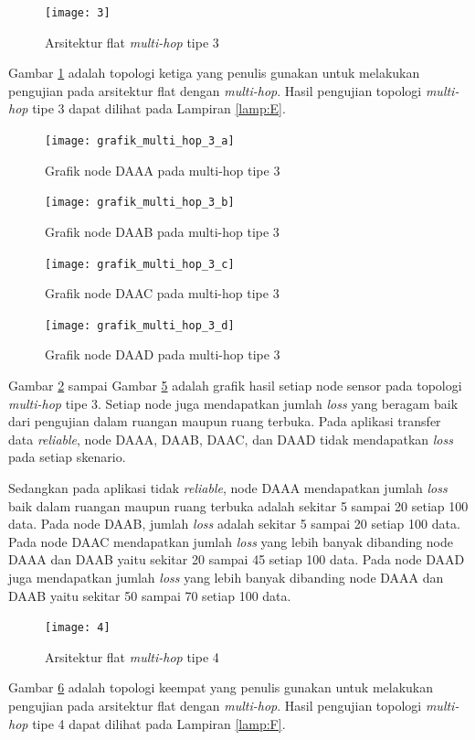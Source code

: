 \begin{figure}[H]
	\centering
	\texttt{[image: 3]}
	\caption{Arsitektur flat \textit{multi-hop} tipe 3}
	\label{fig:3}
\end{figure}
Gambar \ref{fig:3} adalah topologi ketiga yang penulis gunakan untuk melakukan pengujian pada arsitektur flat dengan \textit{multi-hop}. Hasil pengujian topologi \textit{multi-hop} tipe 3 dapat dilihat pada Lampiran \ref{lamp:E}. 

\begin{figure}[H]
	\centering
	\texttt{[image: grafik\_multi\_hop\_3\_a]}
	\caption{Grafik node DAAA pada multi-hop tipe 3}
	\label{fig:grafik_multi_hop_3_a}
\end{figure}
\begin{figure}[H]
	\centering
	\texttt{[image: grafik\_multi\_hop\_3\_b]}
	\caption{Grafik node DAAB pada multi-hop tipe 3}
	\label{fig:grafik_multi_hop_3_b}
\end{figure}
\begin{figure}[H]
	\centering
	\texttt{[image: grafik\_multi\_hop\_3\_c]}
	\caption{Grafik node DAAC pada multi-hop tipe 3}
	\label{fig:grafik_multi_hop_3_c}
\end{figure}
\begin{figure}[H]
	\centering
	\texttt{[image: grafik\_multi\_hop\_3\_d]}
	\caption{Grafik node DAAD pada multi-hop tipe 3}
	\label{fig:grafik_multi_hop_3_d}
\end{figure}
Gambar \ref{fig:grafik_multi_hop_3_a} sampai Gambar \ref{fig:grafik_multi_hop_3_d} adalah grafik hasil setiap node sensor pada topologi \textit{multi-hop} tipe 3. Setiap node juga mendapatkan jumlah \textit{loss} yang beragam baik dari pengujian dalam ruangan maupun ruang terbuka. Pada aplikasi transfer data \textit{reliable}, node DAAA, DAAB, DAAC, dan DAAD tidak mendapatkan \textit{loss} pada setiap skenario.

Sedangkan pada aplikasi tidak \textit{reliable}, node DAAA mendapatkan jumlah \textit{loss} baik dalam ruangan maupun ruang terbuka adalah sekitar  5 sampai 20 setiap 100 data. Pada node DAAB, jumlah \textit{loss} adalah sekitar 5 sampai 20 setiap 100 data. Pada node DAAC mendapatkan jumlah \textit{loss} yang lebih banyak dibanding node DAAA dan DAAB yaitu sekitar 20 sampai 45 setiap 100 data. Pada node DAAD juga mendapatkan jumlah \textit{loss} yang lebih banyak dibanding node DAAA dan DAAB yaitu sekitar 50 sampai 70 setiap 100 data.

\begin{figure}[H]
	\centering
	\texttt{[image: 4]}
	\caption{Arsitektur flat \textit{multi-hop} tipe 4}
	\label{fig:4}
\end{figure}
Gambar \ref{fig:4} adalah topologi keempat yang penulis gunakan untuk melakukan pengujian pada arsitektur flat dengan \textit{multi-hop}. Hasil pengujian topologi \textit{multi-hop} tipe 4 dapat dilihat pada Lampiran \ref{lamp:F}. 

